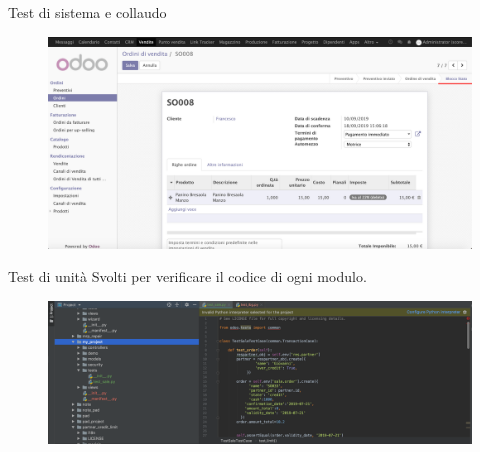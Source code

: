 \documentclass{beamer}
\begin{document}
\begin{frame}{Test di sistema e collaudo}

\begin{figure}[H]
	\begin{center} \includegraphics[width=1\linewidth]{figures/exp_three}
	\end{center}
\end{figure}

\end{frame}

\begin{frame}{Test di unità}
Svolti per verificare il codice di ogni modulo.


\begin{figure}[H]
	\begin{center} \includegraphics[width=1\linewidth]{figures/unit_test}
	\end{center}
\end{figure}

\end{frame}
\end{document}
